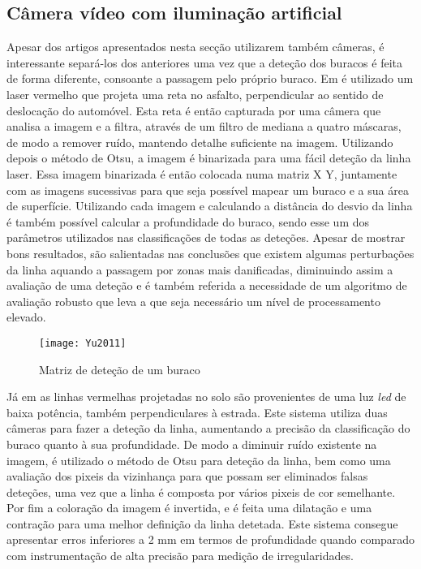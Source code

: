 \subsection{Câmera vídeo com iluminação artificial}
\label{subsec: camera_video_com_iluminacao_artificial}
Apesar dos artigos apresentados nesta secção utilizarem também câmeras, é interessante separá-los dos anteriores uma vez que a deteção dos buracos é feita de forma diferente, consoante a passagem pelo próprio buraco. Em \cite{Yu2011} é utilizado um laser vermelho que projeta uma reta no asfalto, perpendicular ao sentido de deslocação do automóvel. Esta reta é então capturada por uma câmera que analisa a imagem e a filtra, através de um filtro de mediana a quatro máscaras, de modo a remover ruído, mantendo detalhe suficiente na imagem.
Utilizando depois o método de Otsu, a imagem é binarizada para uma fácil deteção da linha laser.
Essa imagem binarizada é então colocada numa matriz X Y, juntamente com as imagens sucessivas para que seja possível mapear um buraco e a sua área de superfície.
Utilizando cada imagem e calculando a distância do desvio da linha é também possível calcular a profundidade do buraco, sendo esse um dos parâmetros utilizados nas classificações de todas as deteções.
Apesar de mostrar bons resultados, são salientadas nas conclusões que existem algumas perturbações da linha aquando a passagem por zonas mais danificadas, diminuindo assim a avaliação de uma deteção e é também referida a necessidade de um algoritmo de avaliação robusto que leva a que seja necessário um nível de processamento elevado.

\begin{figure}[htbp]
	\centering
	\texttt{[image: Yu2011]}
	\caption[Matriz de deteção de um buraco]{Matriz de deteção de um buraco \footnotemark}
	\label{fig:sensor_kinect}
\end{figure}

Já em \cite{He2011} as linhas vermelhas projetadas no solo são provenientes de uma luz \emph{led} de baixa potência, também perpendiculares à estrada. Este sistema utiliza duas câmeras para fazer a deteção da linha, aumentando a precisão da classificação do buraco quanto à sua profundidade.
De modo a diminuir ruído existente na imagem, é utilizado o método de Otsu para deteção da linha, bem como uma avaliação dos pixeis da vizinhança para que possam ser eliminados falsas deteções, uma vez que a linha é composta por vários pixeis de cor semelhante.
Por fim a coloração da imagem é invertida, e é feita uma dilatação e uma contração para uma melhor definição da linha detetada.
Este sistema consegue apresentar erros inferiores a 2 mm em termos de profundidade quando comparado com instrumentação de alta precisão para medição de irregularidades.

